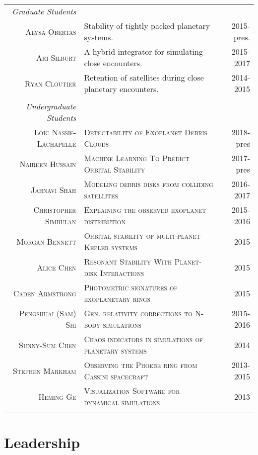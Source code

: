 \documentclass[10pt]{article} %
\begin{document}
\begin{tabular}{r|p{9.6cm}r}

{\it Graduate Students} \\
\textsc{Alysa Obertas} & Stability of tightly packed planetary systems. & 2015-pres. \\
\textsc{Ari Silburt} & A hybrid integrator for simulating close encounters. & 2015-2017 \\
\textsc{Ryan Cloutier} & Retention of satellites during close planetary encounters. & 2014-2015 \\
\\
{\it Undergraduate Students} \\
\textsc{Loic Nassif-Lachapelle} & \textsc{Detectability of Exoplanet Debris Clouds} & 2018-pres \\
\textsc{Naireen Hussain} & \textsc{Machine Learning To Predict Orbital Stability} & 2017-pres \\
\textsc{Jahnavi Shah} & \textsc{Modeling debris disks from colliding satellites} & 2016-2017 \\
\textsc{Christopher Simbulan} & \textsc{Explaining the observed exoplanet distribution} & 2015-2016 \\
\textsc{Morgan Bennett} & \textsc{Orbital stability of multi-planet Kepler systems} & 2015  \\
\textsc{Alice Chen} & \textsc{Resonant Stability With Planet-disk Interactions} & 2015 \\
\textsc{Caden Armstrong} & \textsc{Photometric signatures of exoplanetary rings} & 2015 \\
\textsc{Pengshuai (Sam) Shi} & \textsc{Gen. relativity corrections to N-body simulations} & 2015-2016 \\
\textsc{Sunny-Sum Chen} & \textsc{Chaos indicators in simulations of planetary systems} & 2014 \\
\textsc{Stephen Markham} & \textsc{Observing the Phoebe ring from Cassini spacecraft} & 2013-2015 \\
\textsc{Heming Ge} & \textsc{Visualization Software for dynamical simulations} & 2013 \\
\multicolumn{3}{c}{} \\
\end{tabular}


\section{Leadership}
\end{document}
